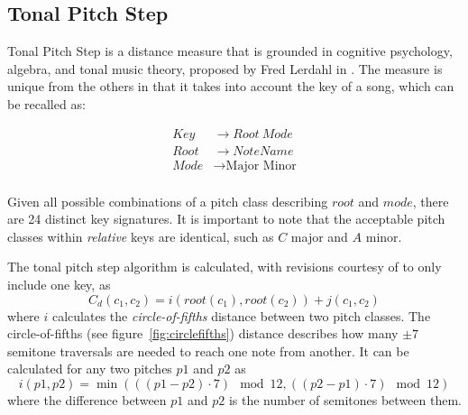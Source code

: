 \subsection{Tonal Pitch Step}

Tonal Pitch Step is a distance measure that is grounded in cognitive psychology, algebra, and tonal music theory, proposed by Fred Lerdahl in \cite{lerdahl1988tonal}. The measure is unique from the others in that it takes into account the key of a song, which can be recalled as:

\begin{align*}
Key &\to Root\ Mode \\
Root &\to NoteName \\
Mode &\to \text{Major Minor} \\
\end{align*}

Given all possible combinations of a pitch class describing $root$ and $mode$, there are 24 distinct key signatures. It is important to note that the acceptable pitch classes within \textit{relative} keys are identical, such as $C$ major and $A$ minor.

The tonal pitch step algorithm is calculated, with revisions courtesy of \cite{de2008tonal} to only include one key, as \[ C_d(c_1, c_2) = i(root(c_1), root(c_2)) + j(c_1, c_2) \] where $i$ calculates the \textit{circle-of-fifths} distance between two pitch classes. The circle-of-fifths (see figure~\ref{fig:circlefifths}) distance describes how many $\pm7$ semitone traversals are needed to reach one note from another. It can be calculated for any two pitches $p1$ and $p2$ as \[i({p1}, {p2}) = \min((({p1} - {p2}) \cdot 7) \mod 12, (({p2} - {p1}) \cdot 7) \mod 12)\] where the difference between ${p1}$ and ${p2}$ is the number of semitones between them.
